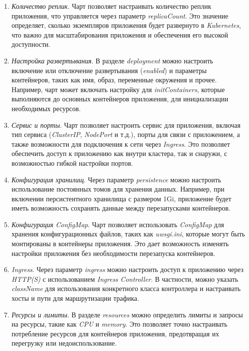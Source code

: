\begin{enumerate}
    \item \textit{Количество реплик}. Чарт позволяет настраивать количество реплик приложения, что управляется через параметр \textit{replicaCount}. Это значение определяет, сколько экземпляров приложения будет развернуто в \textit{Kubernetes}, что важно для масштабирования приложения и обеспечения его высокой доступности.

    \item \textit{Настройка развертывания}. В разделе \textit{deployment} можно настроить включение или отключение развертывания (\textit{enabled}) и параметры контейнеров, таких как имя, образ, переменные окружения и прочее. Например, чарт может включать настройку для \textit{initContainers}, которые выполняются до основных контейнеров приложения, для инициализации необходимых ресурсов.

    \item \textit{Сервис и порты}. Чарт позволяет настроить сервис для приложения, включая тип сервиса (\textit{ClusterIP}, \textit{NodePort} и т.д.), порты для связи с приложением, а также возможности для подключения к сети через \textit{Ingress}. Это позволяет обеспечить доступ к приложению как внутри кластера, так и снаружи, с возможностью гибкой настройки портов.

    \item \textit{Конфигурация хранилищ}. Через параметр \textit{persistence} можно настроить использование постоянных томов для хранения данных. Например, при включении персистентного хранилища с размером 1Gi, приложение будет иметь возможность сохранять данные между перезапусками контейнеров.

    \item \textit{Конфигурация \textit{ConfigMap}}. Чарт позволяет использовать \textit{ConfigMap} для хранения конфигурационных файлов, таких как \textit{uwsgi.ini}, которые могут быть монтированы в контейнеры приложения. Это дает возможность изменять настройки приложения без необходимости перезапуска контейнеров.

    \item \textit{Ingress}. Через параметр \textit{ingress} можно настроить доступ к приложению через \textit{HTTP(S)} с использованием \textit{Ingress Controller}. В частности, можно указать \textit{className} для использования конкретного класса контроллера и настраивать хосты и пути для маршрутизации трафика.

    \item \textit{Ресурсы и лимиты}. В разделе \textit{resources} можно определить лимиты и запросы на ресурсы, такие как \textit{CPU} и \textit{memory}. Это позволяет точно настраивать потребление ресурсов для контейнеров приложения, предотвращая их перегрузку или недоиспользование.


\end{enumerate}
